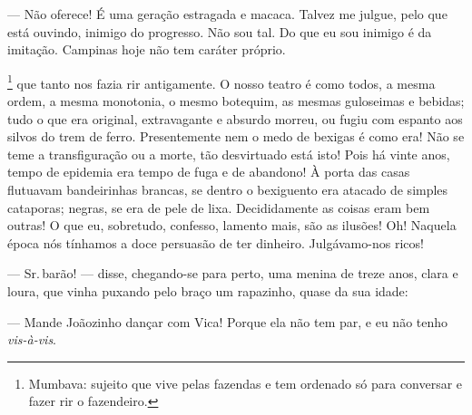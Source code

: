 {

--- Não oferece! É uma geração estragada e macaca. Talvez me
julgue, pelo que está ouvindo, inimigo do progresso. Não sou tal. Do que
eu sou inimigo é da imitação. Campinas hoje não tem caráter
próprio.

\footnote{Mumbava: sujeito que vive
  pelas fazendas e tem ordenado só para conversar e fazer rir o
  fazendeiro.} que tanto nos fazia rir antigamente. O nosso
  teatro é como todos, a mesma ordem, a mesma monotonia, o mesmo
  botequim, as mesmas guloseimas e bebidas; tudo o que era
  original, extravagante e absurdo morreu, ou fugiu com espanto aos silvos
  do trem de ferro. Presentemente nem o medo de bexigas é como era! Não se
  teme a transfiguração ou a morte, tão desvirtuado está isto! Pois
  há vinte anos, tempo de epidemia era tempo de fuga e de
  abandono! À porta das casas flutuavam bandeirinhas brancas, se dentro o
  bexiguento era atacado de simples cataporas; negras, se era de pele de
  lixa. Decididamente as coisas eram bem outras! O que eu, sobretudo,
  confesso, lamento mais, são as ilusões! Oh! Naquela época nós
  tínhamos a doce persuasão de ter dinheiro.
  Julgávamo-nos ricos!

--- Sr.\,barão! --- disse, chegando-se para perto, uma
menina de treze anos, clara e loura, que vinha puxando pelo braço um
rapazinho, quase da sua idade:

--- Mande Joãozinho dançar com Vica! Porque ela não tem par, e
eu não tenho \emph{vis-à-vis}.


}
